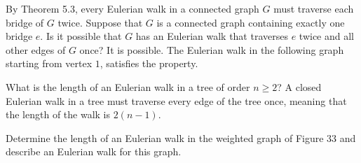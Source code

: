 \documentclass[10pt]{extarticle}
\title{}
\author{}
\date{}
\begin{document}
  \begin{problem}{13}
    By Theorem 5.3, every Eulerian walk in a connected graph $G$ must traverse each bridge of $G$ twice. Suppose that $G$ is a connected graph containing exactly one bridge $e$. Is it possible that $G$ has an Eulerian walk that traverses $e$ twice and all other edges of $G$ once?
    \tcblower
    It is possible. The Eulerian walk in the following graph starting from vertex $1$, satisfies the property.
    \begin{center}
    \end{center}
  \end{problem}
  \begin{problem}{14}
    What is the length of an Eulerian walk in a tree of order $n\geq 2$?
    \tcblower
    A closed Eulerian walk in a tree must traverse every edge of the tree once, meaning that the length of the walk is $2(n-1)$.
  \end{problem}
  \begin{problem}{15}
    Determine the length of an Eulerian walk in the weighted graph of Figure 33 and describe an Eulerian walk for this graph.
    \tcblower

  \end{problem}
\end{document}
